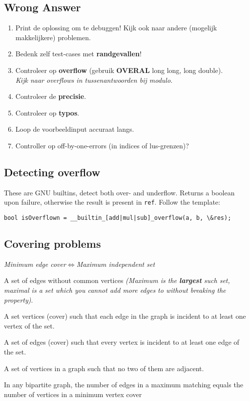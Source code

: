 \documentclass{article}
\begin{document}
\subsection{Wrong Answer}

\begin{enumerate}
	\setlength\itemsep{-.25em}
	\item Print de oplossing om te debuggen! Kijk ook naar andere (mogelijk makkelijkere) problemen.
	\item Bedenk zelf test-cases met \textbf{randgevallen}!
	\item Controleer op \textbf{overflow} (gebruik \textbf{OVERAL} long long, long double).
		\\ \textit{Kijk naar overflows in tussenantwoorden bij modulo.}
	\item Controleer de \textbf{precisie}.
	\item Controleer op \textbf{typo\textquotesingle s}.
	\item Loop de voorbeeldinput accuraat langs.
	\item Controller op off-by-one-errors (in indices of lus-grenzen)?
\end{enumerate}

\subsection{Detecting overflow}
These are GNU builtins, detect both over- and underflow. Returns a boolean upon failure, otherwise the result is present in \texttt{ref}. Follow the template:

\begin{lstlisting}
bool isOverflown = __builtin_[add|mul|sub]_overflow(a, b, \&res);
\end{lstlisting}

\subsection{Covering problems}

\begin{center}
	\emph{Minimum edge cover$\iff$Maximum independent set}
\end{center}

\begin{description}
	\setlength\itemsep{-.25em}
	\item[Matching]
		A set of edges without common vertices \textit{(Maximum is the \textbf{largest} such set, maximal is a set which you cannot add more edges to without breaking the property)}.
	\item[Minimum Vertex Cover]
		A set vertices (cover) such that each edge in the graph is incident to at least one vertex of the set.
	\item[Minimum Edge Cover]
		A set of edges (cover) such that every vertex is incident to at least one edge of the set.
	\item[Maximum Independent Set]
		A set of vertices in a graph such that no two of them are adjacent.
	\item[K\"{o}nig's theorem]
		In any bipartite graph, the number of edges in a maximum matching equals the number of vertices in a minimum vertex cover
\end{description}
\end{document}
